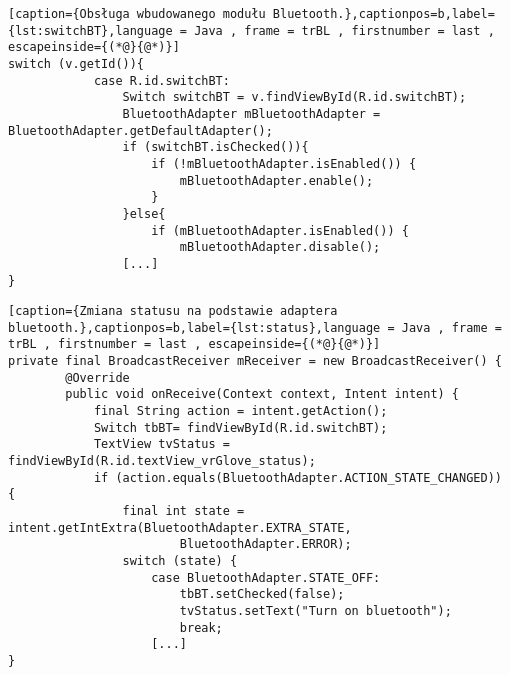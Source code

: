	\begin{lstlisting}[caption={Obsługa wbudowanego modułu Bluetooth.},captionpos=b,label={lst:switchBT},language = Java , frame = trBL , firstnumber = last , escapeinside={(*@}{@*)}]
switch (v.getId()){
            case R.id.switchBT:
            	Switch switchBT = v.findViewById(R.id.switchBT);
        		BluetoothAdapter mBluetoothAdapter = BluetoothAdapter.getDefaultAdapter();
                if (switchBT.isChecked()){
                    if (!mBluetoothAdapter.isEnabled()) {
                        mBluetoothAdapter.enable();
                    }
                }else{
                    if (mBluetoothAdapter.isEnabled()) {
                        mBluetoothAdapter.disable();
                [...]
}
\end{lstlisting}
\begin{lstlisting}[caption={Zmiana statusu na podstawie adaptera bluetooth.},captionpos=b,label={lst:status},language = Java , frame = trBL , firstnumber = last , escapeinside={(*@}{@*)}]
private final BroadcastReceiver mReceiver = new BroadcastReceiver() {
        @Override
        public void onReceive(Context context, Intent intent) {
            final String action = intent.getAction();
            Switch tbBT= findViewById(R.id.switchBT);
            TextView tvStatus = findViewById(R.id.textView_vrGlove_status);
            if (action.equals(BluetoothAdapter.ACTION_STATE_CHANGED)) {
                final int state = intent.getIntExtra(BluetoothAdapter.EXTRA_STATE,
                        BluetoothAdapter.ERROR);
                switch (state) {
                    case BluetoothAdapter.STATE_OFF:
                        tbBT.setChecked(false);
                        tvStatus.setText("Turn on bluetooth");
                        break;
                    [...]
}                    
\end{lstlisting}


